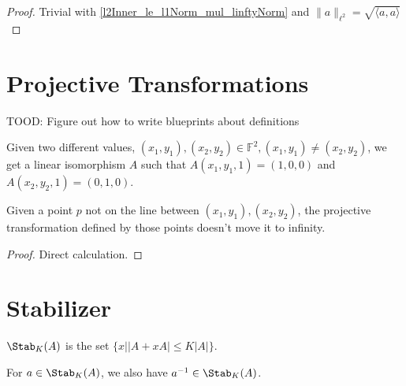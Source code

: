\begin{proof}
    \leanok
    Trivial with \ref{l2Inner_le_l1Norm_mul_linftyNorm} and $\lVert a \rVert_{\ell^2} = \sqrt{\langle a, a \rangle}$
\end{proof}

\chapter{Projective Transformations}
\label{chap:proj}

TOOD: Figure out how to write blueprints about definitions

\begin{definition}
    \label{projective_transform}
    \leanok
    Given two different values, $(x_1, y_1), (x_2, y_2) \in \mathbb{F}^2, (x_1, y_1) \neq (x_2, y_2)$, we get a linear isomorphism $A$ such that
    $A (x_1, y_1, 1) = (1, 0, 0)$ and $A (x_2, y_2, 1) = (0, 1, 0)$.
\end{definition}

\begin{lemma}
    \label{non_erasing}
    \leanok
    Given a point $p$ not on the line between $(x_1, y_1), (x_2, y_2)$, the projective transformation defined
    by those points doesn't move it to infinity.
\end{lemma}

\begin{proof}
    Direct calculation.
\end{proof}



\chapter{Stabilizer}
\label{chap:stab}

\begin{definition}
    \label{Stab}
    \leanok
    $\Stab_K(A)$ is the set $\{x | |A + x A| \leq K |A|\}$.
\end{definition}

\begin{lemma}
    \label{Stab_invt}
    \leanok
    For $a \in \Stab_K(A)$, we also have $a^{-1} \in \Stab_K(A)$.
\end{lemma}

